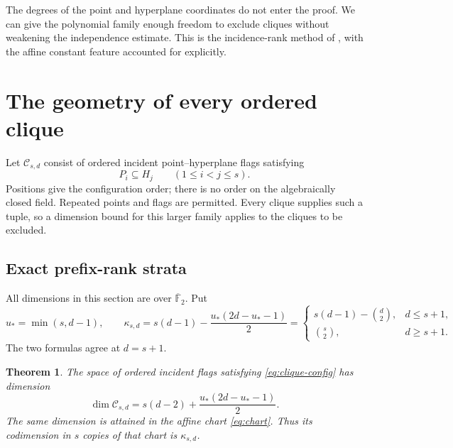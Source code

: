 \documentclass[11pt,a4paper]{article}
\newcommand{\F}{\mathbb F}
\newcommand{\Ccal}{\mathcal C}
\newtheorem{theorem}{Theorem}[section]
\theoremstyle{definition}
\theoremstyle{remark}
\numberwithin{equation}{section}
\begin{document}
The degrees of the point and hyperplane coordinates do not enter the proof. We can give the polynomial family enough freedom to exclude cliques without weakening the independence estimate. This is the incidence-rank method of \cite{IM}, with the affine constant feature accounted for explicitly.

\section{The geometry of every ordered clique}\label{sec:geometry}
Let $\Ccal_{s,d}$ consist of ordered incident point--hyperplane flags satisfying
\begin{equation}\label{eq:clique-config}
P_i\subseteq H_j\qquad(1\le i<j\le s).
\end{equation}
Positions give the configuration order; there is no order on the algebraically closed field. Repeated points and flags are permitted. Every clique supplies such a tuple, so a dimension bound for this larger family applies to the cliques to be excluded.

\subsection{Exact prefix-rank strata}\label{sec:exact}
All dimensions in this section are over $\overline{\F}_2$. Put
\begin{equation}\label{eq:kappa}
u_* =\min(s,d-1),\qquad
\kappa_{s,d}=s(d-1)-\frac{u_*(2d-u_*-1)}2
=\begin{cases}
s(d-1)-\binom d2,&d\le s+1,\\
\binom s2,&d\ge s+1.
\end{cases}
\end{equation}
The two formulas agree at $d=s+1$.

\begin{theorem}\label{thm:exact-dimension}
The space of ordered incident flags satisfying \eqref{eq:clique-config} has dimension
\[
\dim\Ccal_{s,d}=s(d-2)+\frac{u_*(2d-u_*-1)}2.
\]
The same dimension is attained in the affine chart \eqref{eq:chart}. Thus its codimension in $s$ copies of that chart is $\kappa_{s,d}$.
\end{theorem}
\end{document}
